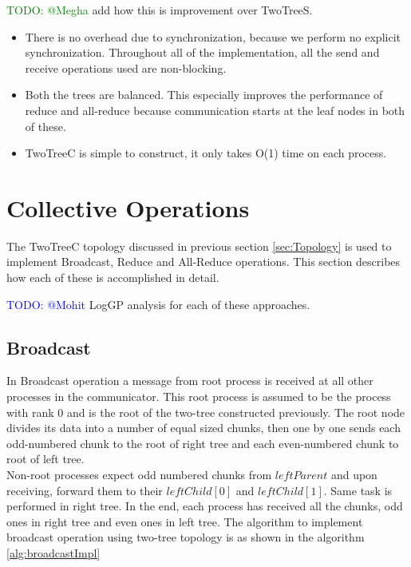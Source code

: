 \documentclass[sigplan,review,anonymous]{acmart}\settopmatter{printfolios=true,printccs=false,printacmref=false}
\begin{document}
\textcolor{green}{TODO: @Megha} add how this is improvement over TwoTreeS.
\begin{itemize}
\item  There is no overhead due to synchronization, because we perform no explicit synchronization. Throughout all of the implementation, all the send and receive operations used are non-blocking.
\item  Both the trees are balanced. This especially improves the performance of reduce and all-reduce because communication starts at the leaf nodes in both of these.
\item  TwoTreeC is simple to construct, it only takes O(1) time on each process.
\end{itemize}


 
\section{Collective Operations}\label{sec:Operations}
The TwoTreeC topology discussed in previous section \ref{sec:Topology} is used to implement Broadcast, Reduce and All-Reduce operations. This section describes how each of these is accomplished in detail.

\textcolor{blue}{TODO: @Mohit} LogGP analysis for each of these approaches.

\subsection{Broadcast}
In Broadcast operation a message from root process is received at all other processes in the communicator. This root process is assumed to be the process with rank 0 and is the root of the two-tree constructed previously. The root node divides its data into a number of equal sized chunks, then one by one sends each odd-numbered chunk to the root of right tree and each even-numbered chunk to root of left tree.\\
Non-root processes expect odd numbered chunks from $leftParent$ and upon receiving, forward them to their $leftChild[0]$ and $leftChild[1]$. Same task is performed in right tree. In the end, each process has received all the chunks, odd ones in right tree and even ones in left tree. The algorithm to implement broadcast operation using two-tree topology is as shown in the algorithm \ref{alg:broadcastImpl}
\end{document}
